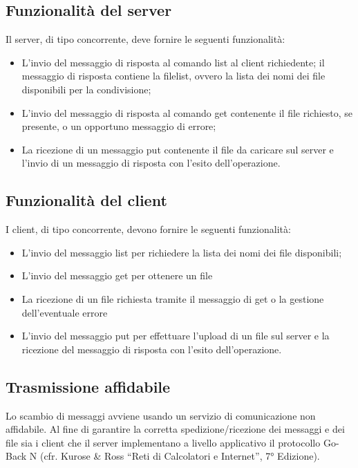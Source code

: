 \documentclass[12pt]{article}
\begin{document}
{\subsection{Funzionalità del server}

Il server, di tipo concorrente, deve fornire le seguenti funzionalità:

\begin{itemize}
    \item L'invio del messaggio di risposta al comando list al client
          richiedente; il messaggio di risposta contiene la filelist, ovvero la
          lista dei nomi dei file disponibili per la condivisione;
    \item L'invio del messaggio di risposta al comando get contenente il file
          richiesto, se presente, o un opportuno messaggio di errore;
    \item La ricezione di un messaggio put contenente il file da caricare sul
          server e l'invio di un messaggio di risposta con l'esito
          dell'operazione.
\end{itemize}

\subsection{Funzionalità del client}

I client, di tipo concorrente, devono fornire le seguenti funzionalità:

\begin{itemize}
    \item L'invio del messaggio list per richiedere la lista dei nomi dei file
          disponibili;
    \item L'invio del messaggio get per ottenere un file
    \item La ricezione di un file richiesta tramite il messaggio di get o la
          gestione dell'eventuale errore
    \item L'invio del messaggio put per effettuare l'upload di un file sul
          server e la ricezione del messaggio di risposta con l'esito
          dell'operazione.
\end{itemize}

\pagebreak
\subsection{Trasmissione affidabile}

Lo scambio di messaggi avviene usando un servizio di comunicazione non
affidabile. Al fine di garantire la corretta spedizione/ricezione dei messaggi
e dei file sia i client che il server implementano a livello applicativo il
protocollo Go-Back N
(cfr. Kurose \& Ross “Reti di Calcolatori e Internet”, 7° Edizione).

}
\end{document}
